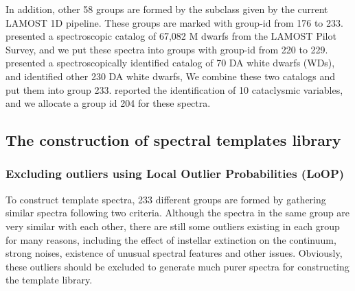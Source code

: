 \documentclass[manuscript]{aastex}
\begin{document}

In addition, other 58 groups are formed by the subclass given by the current LAMOST 1D pipeline.
These groups are marked with group-id from 176 to 233.
  \citet{yi2013m} presented a spectroscopic catalog of 67,082 M dwarfs from the LAMOST Pilot Survey,
and we put these spectra into groups with group-id from 220 to 229.
  \citet{zhao201370}  presented a spectroscopically identified catalog of 70 DA white dwarfs  (WDs),
  and \citet{zhang2013white}  identified other 230  DA  white dwarfs,
We combine these two catalogs and put them into group 233.
  \citet{jiang2013data} reported the identification of 10 cataclysmic variables,
and we allocate a group id 204 for these spectra.
%









\subsection{The construction of spectral templates library}
\subsubsection{Excluding outliers using Local Outlier Probabilities (LoOP)}
To construct template spectra,
233 different groups are formed by gathering similar spectra following two criteria.
Although the spectra  in the same group are very similar with each other, there are still some outliers existing in each group for many reasons,
including the effect of instellar extinction on the continuum, strong noises, existence of unusual spectral features and other issues.
Obviously, these outliers should be excluded to generate much purer spectra for  constructing the template library.
\end{document}
